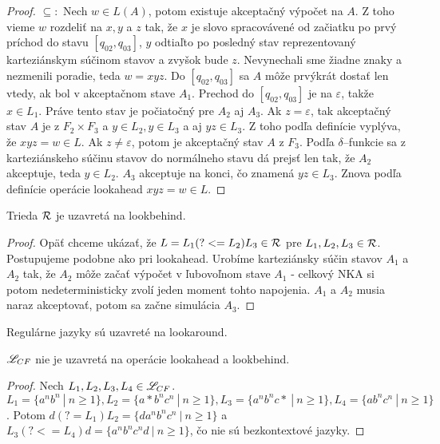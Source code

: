 \begin{proof}
$ \subseteq: $ Nech $w \in L(A)$, potom existuje akceptačný výpočet na $A$. Z toho vieme $w$ rozdeliť na $x,y$ a $z$ tak, že $x$ je slovo spracovávené od začiatku po prvý príchod do stavu $\left[q_{02},q_{03}\right]$, $y$ odtiaľto po posledný stav reprezentovaný karteziánskym súčinom stavov a zvyšok bude $z$. Nevynechali sme žiadne znaky a nezmenili poradie, teda $w=xyz$. Do $\left[q_{02},q_{03}\right]$ sa $A$ môže prvýkrát dostať len vtedy, ak bol v akceptačnom stave $A_1$. Prechod do $\left[q_{02},q_{03}\right]$ je na $\varepsilon$, takže $x \in L_1$. Práve tento stav je počiatočný pre $A_2$ aj $A_3$. Ak $z=\varepsilon$, tak akceptačný stav $A$ je z $F_2\times F_3$ a $y \in L_2, y \in L_3$ a aj $yz \in L_3$. Z toho podľa definície vyplýva, že $xyz=w \in L$. Ak $z\neq \varepsilon$, potom je akceptačný stav $A$ z $F_3$. Podľa $\delta$--funkcie sa z karteziánskeho súčinu stavov do normálneho stavu dá prejsť len tak, že $A_2$ akceptuje, teda $y \in L_2$. $A_3$ akceptuje na konci, čo znamená $yz \in L_3$. Znova podľa definície operácie lookahead $xyz=w \in L$.
\end{proof}

\begin{lema}\label{lb+R}
Trieda ${\cal R}$ je uzavretá na lookbehind.
\end{lema}
\begin{proof}
Opäť chceme ukázať, že $ L = L_{1}(?<=L_{2})L_{3} \in {\cal R} $ pre $ L_{1}, L_{2}, L_{3} \in {\cal R} $. Postupujeme podobne ako pri lookahead. Urobíme karteziánsky súčin stavov $A_1$ a $A_2$ tak, že $A_2$ môže začať výpočet v ľubovoľnom stave $A_1$ - celkový NKA si potom nedeterministicky zvolí jeden moment tohto napojenia. $A_1$ a $A_2$ musia naraz akceptovať, potom sa začne simulácia $A_3$.
\end{proof}

\begin{veta}\label{lookahead+R}
Regulárne jazyky sú uzavreté na lookaround.
\end{veta}

\begin{veta}
$ \mathscr{L}_{CF} $ nie je uzavretá na operácie lookahead a lookbehind.
\end{veta}
\begin{proof}
Nech $ L_{1}, L_{2}, L_{3}, L_4 \in \mathscr{L}_{CF} $. $ L_1 = \lbrace a^nb^n ~|~ n\geq 1 \rbrace , L_2 = \lbrace a*b^nc^n ~|~ n\geq 1\rbrace , L_3 = \lbrace a^nb^nc* ~|~ n \geq 1\rbrace, L_4 = \lbrace ab^nc^n ~|~ n \geq 1 \rbrace$. Potom $ d(?=L_1)L_2 = \lbrace da^nb^nc^n ~|~ n\geq 1 \rbrace $ a $ L_3(?<=L_4)d = \lbrace a^nb^nc^nd ~|~ n\geq 1 \rbrace$, čo nie sú bezkontextové jazyky.
\end{proof}

